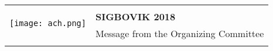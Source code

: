 \begin{center}
  \sffamily
  \begin{tabularx}{\textwidth}{lX}
    \multirow{3}{*}{\texttt{[image: ach.png]}} \\
    \addlinespace[0.3em]
    & \textbf{\Huge{SIGBOVIK 2018}} \\
    \addlinespace[0.75em]
    & \Large{Message from the Organizing Committee} \\
    \addlinespace[1.55em]
    \midrule
  \end{tabularx}
\end{center}

